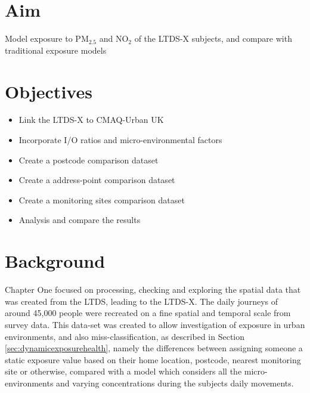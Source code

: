 \section{Aim}
\label{sec:2aim}

Model exposure to PM$_{2.5}$ and NO$_{2}$ of the LTDS-X subjects, and compare  with traditional exposure models 

\section{Objectives}
\label{sec:2objectives}

\begin{itemize}
\item Link the LTDS-X to CMAQ-Urban UK
\item Incorporate I/O ratios and micro-environmental factors
\item Create a postcode comparison dataset
\item Create a address-point comparison dataset
\item Create a monitoring sites comparison dataset
\item Analysis and compare the results
\end{itemize}

\section{Background}
\label{sec:2background}

Chapter One focused on processing, checking and exploring the spatial data that was created from the LTDS, leading to the LTDS-X. The daily journeys of around 45,000 people were recreated on a fine spatial and temporal scale from survey data. This data-set was created to allow investigation of exposure in urban environments, and also miss-classification, as described in Section \ref{sec:dynamicexposurehealth}, namely the differences between assigning someone a static exposure value based on their home location, postcode, nearest monitoring site or otherwise, compared with a model which considers all the micro-environments and varying concentrations during the subjects daily movements.

